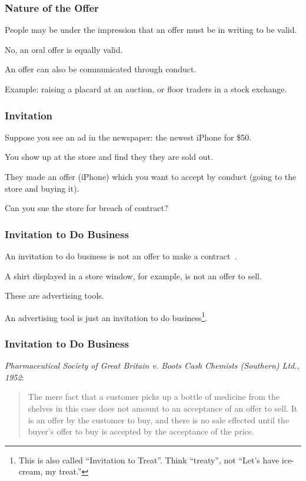 \begin{frame}
\frametitle{Nature of the Offer}

People may be under the impression that an offer must be in writing to be valid. 

No, an oral offer is equally valid.

An offer can also be communicated through conduct. 

Example: raising a placard at an auction, or floor traders in a stock exchange.

\end{frame}



\begin{frame}
\frametitle{Invitation}

Suppose you see an ad in the newspaper: the newest iPhone for \$50.

You show up at the store and find they they are sold out.

They made an offer (iPhone) which you want to accept by conduct (going to the store and buying it).

Can you sue the store for breach of contract?


\end{frame}


\begin{frame}
\frametitle{Invitation to Do Business}

An invitation to do business is not an offer to make a contract~\cite{lba}. 

A shirt displayed in a store window, for example, is not an offer to sell.

These are advertising tools. 

An advertising tool is just an invitation to do business\footnote{This is also called ``Invitation to Treat''. Think ``treaty'', not ``Let's have ice-cream, my treat.''}.

\end{frame}



\begin{frame}
\frametitle{Invitation to Do Business}

{\small\textit{Pharmaceutical Society of Great Britain v. Boots Cash Chemists (Southern) Ltd., 1952}:}

\begin{quote}
	The mere fact that a customer picks up a bottle of medicine from the shelves in this case does not amount to an acceptance of an offer to sell. It is an offer by the customer to buy, and there is no sale effected until the buyer's offer to buy is accepted by the acceptance of the price.
\end{quote}

\end{frame}



